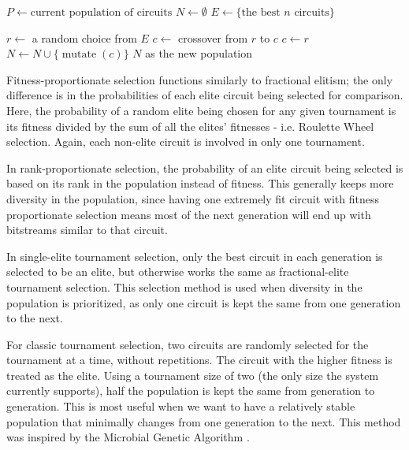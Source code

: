 \documentclass{ieeeaccess}
\DeclareMathOperator*{\random}{random}
\DeclareMathOperator*{\mutate}{mutate}
\begin{document}
\begin{algorithm}[ht]
\caption{Fractional Elites Tournament Selection} \label{alg-fractional-elites}
\begin{algorithmic}[1]
    \State $P \gets \text{current population of circuits}$
    \State $N \gets \emptyset$
    \State $E \gets \{ \text{the best $n$ circuits} \}$

        \State $r \gets$ a random choice from $E$
        \If{ $\random (0,1) \leq \text{crossover probability}$}
            \State $c \gets$ crossover from $r$ to $c$
        \Else
            \State $c \gets r$
        \EndIf
        \State $N \gets N \cup \{\mutate(c)\}$
    \EndFor
    \State \Return $N$ as the new population
\end{algorithmic}
\end{algorithm}

Fitness-proportionate selection functions similarly to fractional elitism; the only difference is in the probabilities of each elite circuit being selected for comparison. Here, the probability of a random elite being chosen for any given tournament is its fitness divided by the sum of all the elites' fitnesses - i.e. Roulette Wheel selection. Again, each non-elite circuit is involved in only one tournament.


In rank-proportionate selection, the probability of an elite circuit being selected is based on its rank in the population instead of fitness. This generally keeps more diversity in the population, since having one extremely fit circuit with fitness proportionate selection means most of the next generation will end up with bitstreams similar to that circuit.



In single-elite tournament selection, only the best circuit in each generation is selected to be an elite, but otherwise works the same as fractional-elite tournament selection. This selection method is used when diversity in the population is prioritized, as only one circuit is kept the same from one generation to the next.


 For classic tournament selection, two circuits are randomly selected for the tournament at a time, without repetitions. The circuit with the higher fitness is treated as the elite. Using a tournament size of two (the only size the system currently supports), half the population is kept the same from generation to generation. This is most useful when we want to have a relatively stable population that minimally changes from one generation to the next. This method was inspired by the Microbial Genetic Algorithm \cite{Harvey2011TheAlgorithm}.
\end{document}
